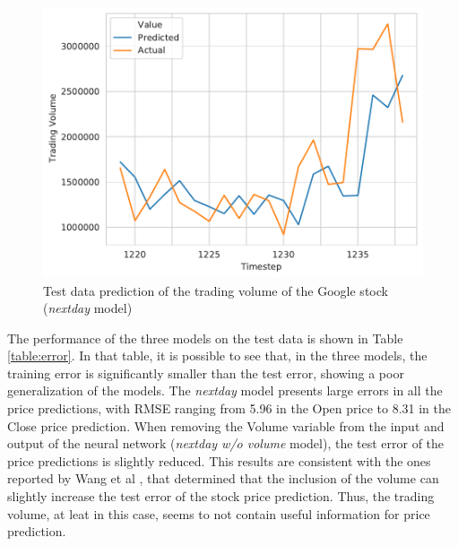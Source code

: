 \documentclass[10pt,twocolumn,letterpaper]{article}
\begin{document}
\begin{figure}[h]
	\begin{center}
		\includegraphics[width=1.0\linewidth]{prediction_volume.pdf}
	\end{center}
	\caption{Test data prediction of the trading volume of the Google stock (\textit{nextday} model)}
	\label{fig:volume_pred}
\end{figure}

The performance of the three models on the test data is shown in Table \ref{table:error}. In that table, it is possible to see that, in the three models, the training error is significantly smaller than the test error, showing a poor generalization of the models. The \textit{nextday} model presents large errors in all the price predictions, with RMSE ranging from 5.96 in the Open price to 8.31 in the Close price prediction. When removing the Volume variable from the input and output of the neural network (\textit{nextday w/o volume} model), the test error of the price predictions is slightly reduced. This results are consistent with the ones reported by Wang et al \cite{Wang2003}, that determined that the inclusion of the volume can slightly increase the test error of the stock price prediction. Thus, the trading volume, at leat in this case, seems to not contain useful information for price prediction. 
\end{document}
